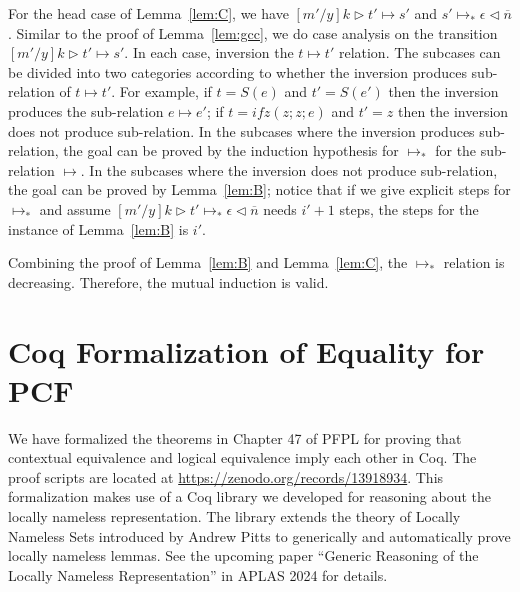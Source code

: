 \documentclass{article}
\begin{document}
For the head case of Lemma~\ref{lem:C},
we have $[m'/y]k\triangleright t' \longmapsto s'$
and $s' \longmapsto_* \epsilon\triangleleft\overline{n}$.
Similar to the proof of Lemma~\ref{lem:gcc}, we do case analysis on
the transition $[m'/y]k\triangleright t' \longmapsto s'$.
In each case, inversion the $t\longmapsto t'$ relation.
The subcases can be divided into two categories
according to whether the inversion produces sub-relation of $t\longmapsto t'$.
For example, if $t = S (e)$ and $t' = S (e')$ then the inversion produces the sub-relation $e\longmapsto e'$;
if $t = \mathit{ifz}(z;z;e)$ and $t' = z$ then the inversion does not produce sub-relation.
In the subcases where the inversion produces sub-relation, the goal can be proved by the induction hypothesis for $\longmapsto_*$
for the sub-relation $\longmapsto$.
In the subcases where the inversion does not produce sub-relation, the goal can be proved by Lemma~\ref{lem:B};
notice that if we give explicit steps for $\longmapsto_*$
and assume $[m'/y]k\triangleright t'\longmapsto_* \epsilon\triangleleft\overline{n}$ needs $i'+1$ steps,
the steps for the instance of Lemma~\ref{lem:B} is $i'$.

Combining the proof of Lemma~\ref{lem:B} and Lemma~\ref{lem:C}, the $\longmapsto_*$ relation is decreasing.
Therefore, the mutual induction is valid.

\section{Coq Formalization of Equality for PCF}

We have formalized the theorems in Chapter 47 of PFPL for proving that
contextual equivalence and logical equivalence imply each other in
Coq. The proof scripts are located at
\url{https://zenodo.org/records/13918934}. This formalization makes
use of a Coq library we developed for reasoning about the locally
nameless representation. The library extends the theory of Locally
Nameless Sets introduced by Andrew Pitts to generically and
automatically prove locally nameless lemmas. See the upcoming
paper ``Generic Reasoning of the Locally Nameless Representation'' in
APLAS 2024 for details.
\end{document}
